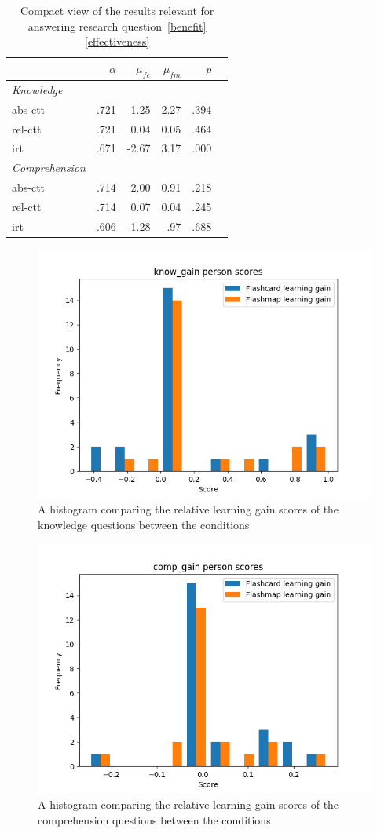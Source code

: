 \begin{table}
    \centering
    \begin{tabular}{lrrrrr}
        \toprule
        & $\alpha$ & $\mu_{fc}$ & $\mu_{fm}$ & $p$ \\
        \midrule
        \emph{Knowledge} &&&& \\
        \midrule
        abs-ctt & .721 & 1.25 & 2.27 & .394 \\
        rel-ctt & .721 & 0.04 & 0.05 & .464 \\
        irt & .671 & -2.67 & 3.17 & .000 \\
        \midrule
        \emph{Comprehension} &&&& \\
        \midrule
        abs-ctt & .714 & 2.00 & 0.91 & .218 \\
        rel-ctt & .714 & 0.07 & 0.04 & .245\\
        irt & .606 & -1.28 & -.97 & .688 \\
        \bottomrule
    \end{tabular}
    \caption{Compact view of the results relevant for answering research question~\protect\ref{benefit}\protect\ref{effectiveness}}
    \label{tab:learning_gain_effect}
\end{table}

\begin{figure}
    \centering
    \includegraphics[width=.7\textwidth]{img/know_gain_abil.png}
    \caption{A histogram comparing the relative learning gain scores of the knowledge questions between the conditions}
    \label{fig:know_gain_abil}
\end{figure}
\begin{figure}
    \centering
    \includegraphics[width=.7\textwidth]{img/comp_gain_abil.png}
    \caption{A histogram comparing the relative learning gain scores of the comprehension questions between the conditions}
    \label{fig:comp_gain_abil}
\end{figure}
